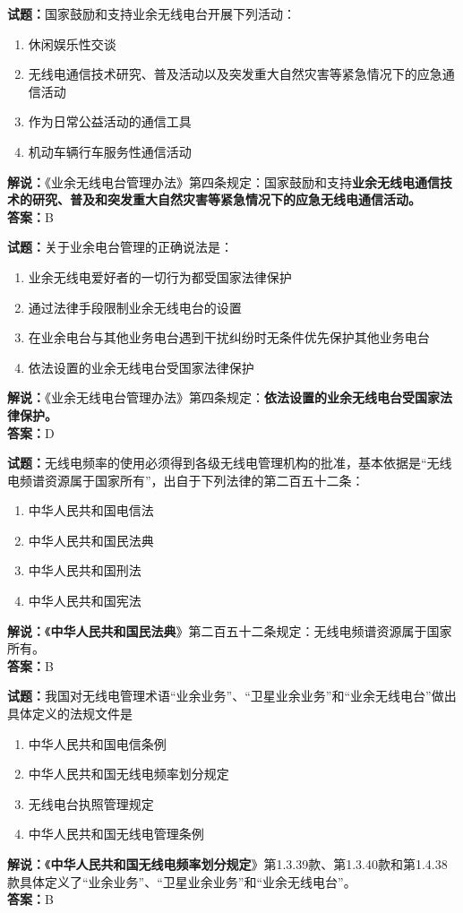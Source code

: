 \documentclass{ctexbook}
\begin{document}
\bigskip

\noindent\textbf{试题：}国家鼓励和支持业余无线电台开展下列活动：
\begin{enumerate}[leftmargin=3em]
  \item 休闲娱乐性交谈
  \item 无线电通信技术研究、普及活动以及突发重大自然灾害等紧急情况下的应急通信活动
  \item 作为日常公益活动的通信工具
  \item 机动车辆行车服务性通信活动
\end{enumerate}
\noindent\textbf{解说：}《业余无线电台管理办法》第四条规定：国家鼓励和支持\textbf{业余无线电通信技术的研究、普及和突发重大自然灾害等紧急情况下的应急无线电通信活动。}\\\noindent\textbf{答案：}B

\bigskip

\noindent\textbf{试题：}关于业余电台管理的正确说法是：
\begin{enumerate}[leftmargin=3em]
  \item 业余无线电爱好者的一切行为都受国家法律保护
  \item 通过法律手段限制业余无线电台的设置
  \item 在业余电台与其他业务电台遇到干扰纠纷时无条件优先保护其他业务电台
  \item 依法设置的业余无线电台受国家法律保护
\end{enumerate}
\noindent\textbf{解说：}《业余无线电台管理办法》第四条规定：\textbf{依法设置的业余无线电台受国家法律保护。}\\\noindent\textbf{答案：}D

\bigskip

\noindent\textbf{试题：}无线电频率的使用必须得到各级无线电管理机构的批准，基本依据是“无线电频谱资源属于国家所有”，出自于下列法律的第二百五十二条：
\begin{enumerate}[leftmargin=3em]
  \item 中华人民共和国电信法
  \item 中华人民共和国民法典
  \item 中华人民共和国刑法
  \item 中华人民共和国宪法
\end{enumerate}
\noindent\textbf{解说：}《\textbf{中华人民共和国民法典}》第二百五十二条规定：无线电频谱资源属于国家所有。\\\noindent\textbf{答案：}B

\bigskip

\noindent\textbf{试题：}我国对无线电管理术语“业余业务”、“卫星业余业务”和“业余无线电台”做出具体定义的法规文件是
\begin{enumerate}[leftmargin=3em]
  \item 中华人民共和国电信条例
  \item 中华人民共和国无线电频率划分规定
  \item 无线电台执照管理规定
  \item 中华人民共和国无线电管理条例
\end{enumerate}
\textbf{解说：}《\textbf{中华人民共和国无线电频率划分规定}》第1.3.39款、第1.3.40款和第1.4.38款具体定义了“业余业务”、“卫星业余业务”和“业余无线电台”。\\\noindent\textbf{答案：}B
\end{document}
